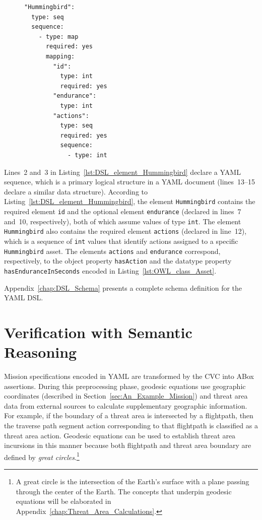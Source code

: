 \begin{figure}[ht]
\begin{lstlisting}[caption={Schema definition for the DSL element \texttt{Hummingbird}},label=lst:DSL_element_Hummingbird]
"Hummingbird":
  type: seq
  sequence:
    - type: map
      required: yes
      mapping:
        "id":
          type: int
          required: yes
        "endurance":
          type: int
        "actions":
          type: seq
          required: yes
          sequence:
            - type: int
\end{lstlisting}
\end{figure}

Lines~2 and~3 in Listing~\ref{lst:DSL_element_Hummingbird} declare a YAML sequence, which is a primary logical structure in a YAML document (lines~13--15 declare a similar data structure). According to Listing~\ref{lst:DSL_element_Hummingbird}, the element \texttt{Hummingbird} contains the required element \texttt{id} and the optional element \texttt{endurance} (declared in lines~7 and~10, respectively), both of which assume values of type \texttt{int}. The element \texttt{Hummingbird} also contains the required element \texttt{actions} (declared in line~12), which is a sequence of \texttt{int} values that identify actions assigned to a specific \texttt{Hummingbird} asset. The elements \texttt{actions} and \texttt{endurance} correspond, respectively, to the object property \texttt{hasAction} and the datatype property \texttt{hasEnduranceInSeconds} encoded in Listing~\ref{lst:OWL_class_Asset}.

Appendix~\ref{chap:DSL_Schema} presents a complete schema definition for the YAML DSL\@.

\section{Verification with Semantic Reasoning}
\label{sec:Verification_with_Semantic_Reasoning}

Mission specifications encoded in YAML are transformed by the CVC into ABox assertions. During this preprocessing phase, geodesic equations use geographic coordinates (described in Section~\ref{sec:An_Example_Mission}) and threat area data from external sources to calculate supplementary geographic information. For example, if the boundary of a threat area is intersected by a flightpath, then the traverse path segment action corresponding to that flightpath is classified as a threat area action. Geodesic equations can be used to establish threat area incursions in this manner because both flightpath and threat area boundary are defined by \emph{great circles}.\footnote{A great circle is the intersection of the Earth's surface with a plane passing through the center of the Earth. The concepts that underpin geodesic equations will be elaborated in Appendix~\ref{chap:Threat_Area_Calculations}.}

